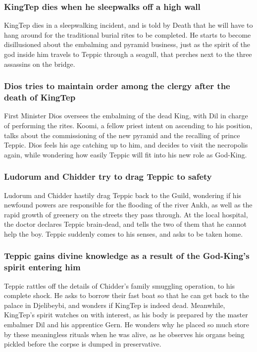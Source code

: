 \subsubsection{\Gls{KingTep} dies when he sleepwalks off a high wall}
\Gls{KingTep} dies in a sleepwalking incident, and is told by \Gls{Death} that he will have to hang
around for the traditional burial rites to be completed. He starts to become disillusioned about
the embalming and pyramid business, just as the spirit of the god inside him travels to \Gls{Teppic}
through a seagull, that perches next to the three assassins on the bridge.

\subsubsection{\Gls{Dios} tries to maintain order among the clergy after the death of \Gls{KingTep}}
First Minister \Gls{Dios} oversees the embalming of the dead King, with \Gls{Dil} in charge of
performing the rites. \Gls{Koomi}, a fellow priest intent on ascending to his position, talks about
the commissioning of the new pyramid and the recalling of prince \Gls{Teppic}. \Gls{Dios} feels his
age catching up to him, and decides to visit the necropolis again, while wondering how easily
\Gls{Teppic} will fit into his new role as God-King.

\subsubsection{\Gls{Ludorum} and \Gls{Chidder} try to drag \Gls{Teppic} to safety}
\Gls{Ludorum} and \Gls{Chidder} hastily drag \Gls{Teppic} back to the Guild, wondering if his
newfound powers are responsible for the flooding of the river Ankh, as well as the rapid growth of
greenery on the streets they pass through. At the local hospital, the doctor declares \Gls{Teppic}
brain-dead, and tells the two of them that he cannot help the boy. \Gls{Teppic} suddenly comes to
his senses, and asks to be taken home.

\subsubsection{\Gls{Teppic} gains divine knowledge as a result of the God-King's spirit entering
    him}
\Gls{Teppic} rattles off the details of \Gls{Chidder}'s family smuggling operation, to his complete
shock. He asks to borrow their fast boat so that he can get back to the palace in Djelibeybi, and
wonders if \Gls{KingTep} is indeed dead. Meanwhile, \Gls{KingTep}'s spirit watches on with interest,
as his body is prepared by the master embalmer \Gls{Dil} and his apprentice \Gls{Gern}. He wonders
why he placed so much store by these meaningless rituals when he was alive, as he observes his
organs being pickled before the corpse is dumped in preservative.


